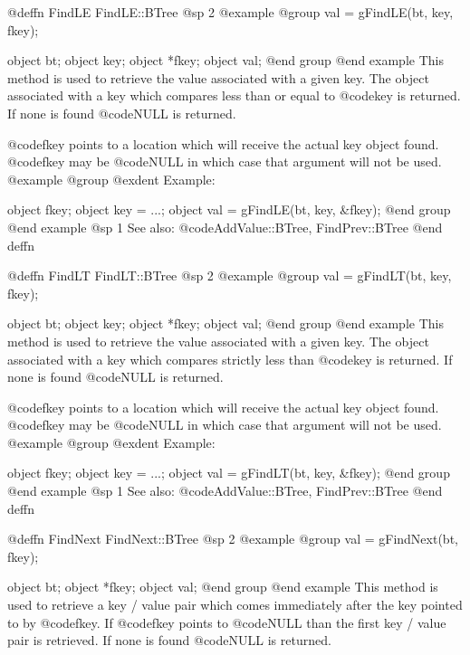 @deffn {FindLE} FindLE::BTree
@sp 2
@example
@group
val = gFindLE(bt, key, fkey);

object  bt;
object  key;
object  *fkey;
object  val;
@end group
@end example
This method is used to retrieve the value associated with a given key.
The object associated with a key which compares less than or equal to
@code{key} is returned.  If none is found @code{NULL} is returned.

@code{fkey} points to a location which will receive the actual key
object found.  @code{fkey} may be @code{NULL} in which case that
argument will not be used.
@example
@group
@exdent Example:

object  fkey;
object  key = ...;
object  val = gFindLE(bt, key, &fkey);
@end group
@end example
@sp 1
See also:  @code{AddValue::BTree, FindPrev::BTree}
@end deffn












@deffn {FindLT} FindLT::BTree
@sp 2
@example
@group
val = gFindLT(bt, key, fkey);

object  bt;
object  key;
object  *fkey;
object  val;
@end group
@end example
This method is used to retrieve the value associated with a given key.
The object associated with a key which compares strictly less than
@code{key} is returned.  If none is found @code{NULL} is returned.

@code{fkey} points to a location which will receive the actual key
object found.  @code{fkey} may be @code{NULL} in which case that
argument will not be used.
@example
@group
@exdent Example:

object  fkey;
object  key = ...;
object  val = gFindLT(bt, key, &fkey);
@end group
@end example
@sp 1
See also:  @code{AddValue::BTree, FindPrev::BTree}
@end deffn















@deffn {FindNext} FindNext::BTree
@sp 2
@example
@group
val = gFindNext(bt, fkey);

object  bt;
object  *fkey;
object  val;
@end group
@end example
This method is used to retrieve a key / value pair which comes
immediately after the key pointed to by @code{fkey}.  If @code{fkey}
points to @code{NULL} than the first key / value pair is retrieved.  If
none is found @code{NULL} is returned.

